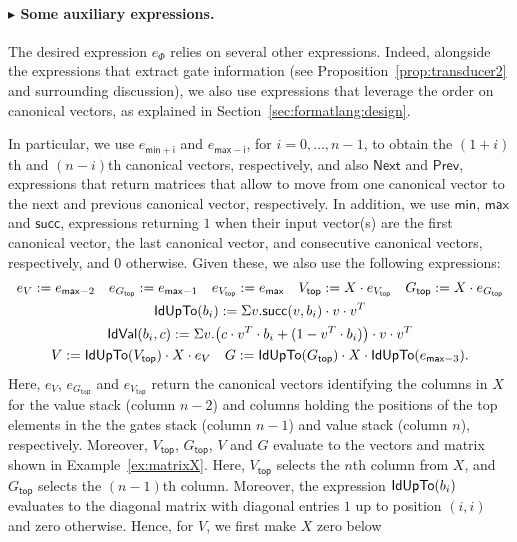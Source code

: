 \paragraph{$\blacktriangleright$ Some auxiliary expressions.} 
The desired \langfor expression $e_\Phi$ relies on several other expressions. Indeed, alongside
the expressions that extract gate information (see Proposition~\ref{prop:transducer2} and surrounding discussion), we also use \langfor expressions that leverage the order on canonical vectors, as explained in Section~\ref{sec:formatlang:design}. 

In particular, we use  $e_{\mathsf{min}+\mathsf{i}}$ and  $e_{\mathsf{max}-\mathsf{i}}$, for $i=0,\ldots,n-1$,
to obtain the $(1+i)$th and $(n-i)$th canonical vectors, respectively, and also $\mathsf{Next}$ and $\mathsf{Prev}$, expressions that return matrices that allow to
move from one canonical vector to the next and previous canonical vector, respectively. In addition, we use $\mathsf{min}$, $\mathsf{max}$ and $\mathsf{succ}$,  expressions returning
$1$ when their input vector(s) are the first canonical vector, the last canonical vector, and consecutive canonical vectors, respectively, and $0$ otherwise. Given these, we also use the following expressions:
\begin{gather*}\allowdisplaybreaks
   e_{V}:=e_{\mathsf{max}-2} \quad e_{G_{\mathsf{top}}}:=e_{\mathsf{max}-1} \quad     e_{V_{\mathsf{top}}}:=e_{\mathsf{max}} \quad 
  V_{\mathsf{top}}:= X\cdot e_{V_{\mathsf{top}}} \quad  G_{\mathsf{top}} :=X\cdot e_{G_{\mathsf{top}}}\\
   \Iden{b_i}:=\ssum v. \mathsf{succ}(v,b_i)\cdot v\cdot v^T  \\
\pondIden{b_i}{c}:=\ssum v. \bigl(c\cdot v^T\cdot b_i + (1- v^T\cdot b_i)\bigr)\cdot v\cdot v^T \\
           V:= \Iden{V_{\mathsf{top}}} \cdot X \cdot e_V \quad
        G := \Iden{G_{\mathsf{top}}}\cdot X \cdot \Iden{e_{\mathsf{max}-3}}.
 \end{gather*}
Here, $e_V$, $e_{G_{\mathsf{top}}}$ and $e_{V_{\mathsf{top}}}$ return the canonical vectors identifying the columns in $X$ for the value stack (column $n-2$) and columns holding the positions of the top elements in the the gates stack (column $n-1$) and value stack (column $n$), respectively. Moreover, 
 $V_{\mathsf{top}}$, $G_{\mathsf{top}}$, $V$ and $G$ evaluate to
the vectors and matrix shown in Example~\ref{ex:matrixX}. Here,  $V_{\mathsf{top}}$
selects the $n$th column from $X$, and  $G_{\mathsf{top}}$ selects the $(n-1)$th column. Moreover, the expression $\mathsf{IdUpTo}(b_i)$ evaluates to the diagonal matrix with diagonal entries $1$ up to position $(i,i)$ and zero otherwise. Hence, for $V$, we first make $X$ zero below
